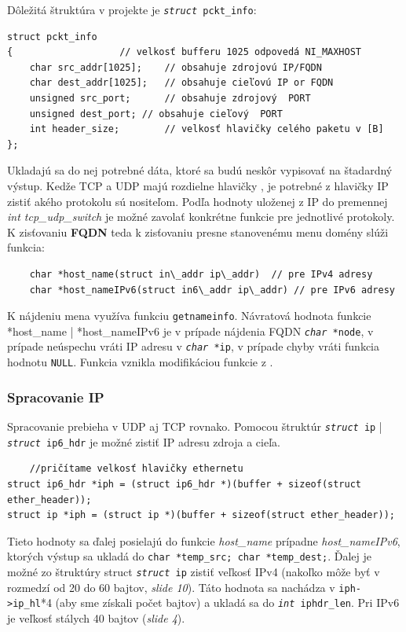 \documentclass[11pt, a4paper]{article}
\begin{document}
	Dôležitá štruktúra v projekte je \texttt{\emph{struct} pckt\_info}:
	\begin{lstlisting}
struct pckt_info 
{					// velkosť bufferu 1025 odpovedá NI_MAXHOST 
    char src_addr[1025];	// obsahuje zdrojovú IP/FQDN  
    char dest_addr[1025];	// obsahuje cieľovú IP or FQDN
    unsigned src_port;		// obsahuje zdrojový  PORT
    unsigned dest_port;	// obsahuje cieľový  PORT
    int header_size;		// velkosť hlavičky celého paketu v [B] 
};
	\end{lstlisting}
	Ukladajú sa do nej potrebné dáta, ktoré sa budú neskôr vypisovať na štadardný výstup.
	Kedže TCP a UDP majú rozdielne hlavičky \cite{prednaskaTransport}, je potrebné z hlavičky IP zistiť akého protokolu sú nositeľom. Podľa hodnoty uloženej z IP do premennej \emph{int tcp\_udp\_switch} je možné zavolať konkrétne funkcie pre jednotlivé protokoly.
	K zisťovaniu \textbf{FQDN} teda k zisťovaniu presne stanovenému menu domény \cite{WikiFQDN} slúži funkcia:
	\begin{lstlisting}
	char *host_name(struct in\_addr ip\_addr)  // pre IPv4 adresy
	char *host_nameIPv6(struct in6\_addr ip\_addr) // pre IPv6 adresy
	\end{lstlisting}
	K nájdeniu mena využíva funkciu \texttt{getnameinfo}. Návratová hodnota funkcie *host\_name | *host\_nameIPv6 je v prípade nájdenia FQDN \texttt{\emph{char} *node}, v prípade neúspechu vráti IP adresu v \texttt{\emph{char} *ip}, v prípade chyby vráti funkcia hodnotu \texttt{NULL}. Funkcia vznikla modifikáciou funkcie z \cite{hostname}.
	
	\subsubsection{Spracovanie IP}
	\label{spracovanie IP}
	Spracovanie prebieha v UDP aj TCP rovnako.
	Pomocou štruktúr \texttt{\emph{struct} ip} | \texttt{\emph{struct} ip6\_hdr} je možné zistiť IP adresu zdroja a cieľa. 
	\begin{lstlisting}
	//pričítame velkosť hlavičky ethernetu
struct ip6_hdr *iph = (struct ip6_hdr *)(buffer + sizeof(struct ether_header));
struct ip *iph = (struct ip *)(buffer + sizeof(struct ether_header));	
	\end{lstlisting}
	
Tieto hodnoty sa ďalej posielajú do funkcie \emph{host\_name} prípadne \emph{host\_nameIPv6}, ktorých výstup sa ukladá do \texttt{char *temp\_src;
    char *temp\_dest;}. Ďalej je možné zo štruktúry struct \texttt{\emph{struct} ip} zistiť veľkosť IPv4 (nakoľko môže byť v rozmedzí od 20 do 60 bajtov, \emph{slide 10}\cite{prednaskaIPv4}). Táto hodnota sa nachádza v \texttt{iph->ip\_hl}*4 (aby sme získali počet bajtov) a ukladá sa do \texttt{\emph{int} iphdr\_len}. Pri IPv6 je veľkosť stálych 40 bajtov (\emph{slide 4}\cite{prednaskaIPv6}).
    
\end{document}
